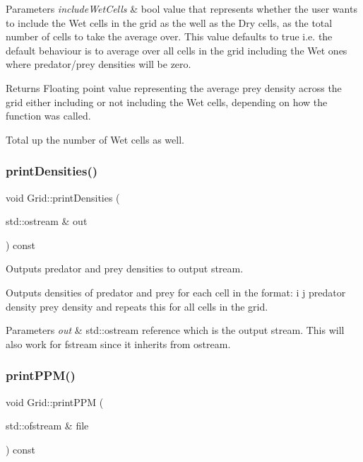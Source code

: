 \begin{DoxyParams}{Parameters}
{\em include\+Wet\+Cells} & bool value that represents whether the user wants to include the Wet cells in the grid as the well as the Dry cells, as the total number of cells to take the average over. This value defaults to true i.\+e. the default behaviour is to average over all cells in the grid including the Wet ones where predator/prey densities will be zero.\\
\hline
\end{DoxyParams}
\begin{DoxyReturn}{Returns}
Floating point value representing the average prey density across the grid either including or not including the Wet cells, depending on how the function was called. 
\end{DoxyReturn}
Total up the number of Wet cells as well. \mbox{\label{class_grid_a4971cb9d47440bc63488993d5647f943}} 
\subsubsection{\texorpdfstring{print\+Densities()}{printDensities()}}
{\footnotesize\ttfamily void Grid\+::print\+Densities (\begin{DoxyParamCaption}\item[{std\+::ostream \&}]{out }\end{DoxyParamCaption}) const}



Outputs predator and prey densities to output stream. 

Outputs densities of predator and prey for each cell in the format\+: i j predator density prey density and repeats this for all cells in the grid.


\begin{DoxyParams}{Parameters}
{\em out} & std\+::ostream reference which is the output stream. This will also work for fstream since it inherits from ostream. \\
\hline
\end{DoxyParams}
\mbox{\label{class_grid_a518355eee78ffbe468034fed65bbcb48}} 
\subsubsection{\texorpdfstring{print\+P\+P\+M()}{printPPM()}}
{\footnotesize\ttfamily void Grid\+::print\+P\+PM (\begin{DoxyParamCaption}\item[{std\+::ofstream \&}]{file }\end{DoxyParamCaption}) const}



